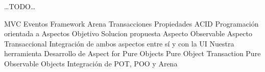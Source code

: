   

\ldots TODO\ldots

		MVC
		Eventos
		Framework Arena
	Transacciones
		Propiedades ACID
	Programación orientada a Aspectos
Objetivo
Solucion propuesta
	Aspecto Observable
 	Aspecto Transaccional
 	Integración de ambos aspectos entre sí y con la UI 
Nuestra herramienta
 	Desarrollo de Aspect for Pure Objects
 	Pure Object Transaction
 	Pure Observable Objects
 	Integración de POT, POO y Arena
